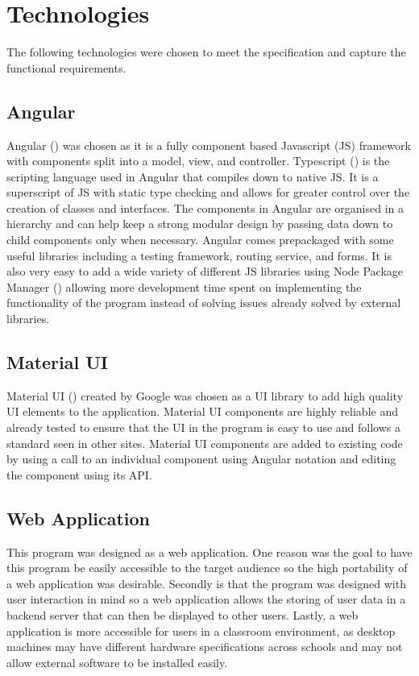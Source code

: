 \documentclass{l4proj}
\begin{document}
\section{Technologies}
The following technologies were chosen to meet the specification and capture the functional requirements.

\subsection{Angular}
Angular (\cite{noauthor_angular_nodate-1}) was chosen as it is a fully component based Javascript (JS) framework with components split into a model, view, and controller. Typescript (\cite{noauthor_typed_nodate}) is the scripting language used in Angular that compiles down to native JS. It is a superscript of JS with static type checking and allows for greater control over the creation of classes and interfaces. The components in Angular are organised in a hierarchy and can help keep a strong modular design by passing data down to child components only when necessary. Angular comes prepackaged with some useful libraries including a testing framework, routing service, and forms. It is also very easy to add a wide variety of different JS libraries using Node Package Manager (\cite{noauthor_npm_nodate}) allowing more development time spent on implementing the functionality of the program instead of solving issues already solved by external libraries.

\subsection{Material UI}
Material UI (\cite{material}) created by Google was chosen as a UI library to add high quality UI elements to the application. Material UI components are highly reliable and already tested to ensure that the UI in the program is easy to use and follows a standard seen in other sites. Material UI components are added to existing code by using a call to an individual component using Angular notation and editing the component using its API.

\subsection{Web Application}
This program was designed as a web application. One reason was the goal to have this program be easily accessible to the target audience so the high portability of a web application was desirable. Secondly is that the program was designed with user interaction in mind so a web application allows the storing of user data in a backend server that can then be displayed to other users. Lastly, a web application is more accessible for users in a classroom environment, as desktop machines may have different hardware specifications across schools and may not allow external software to be installed easily.
\end{document}

